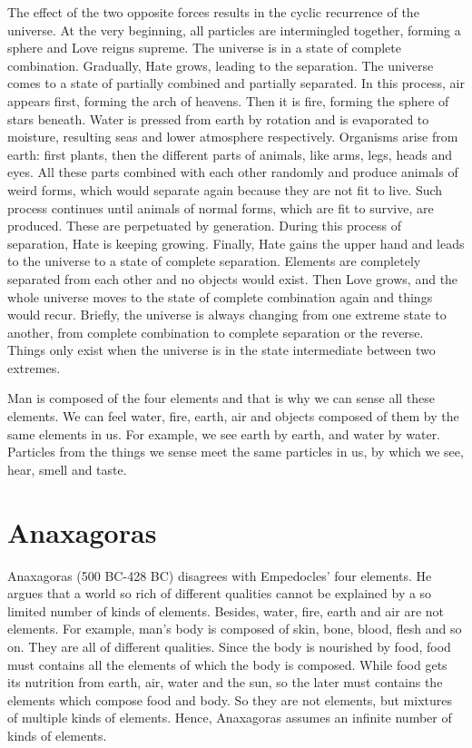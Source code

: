 \documentclass[11pt]{article}
\begin{document}
\begin{sloppypar}
The effect of the two opposite forces results in the cyclic recurrence of the universe. 
At the very beginning, all particles are intermingled together, forming a sphere and Love reigns supreme. 
The universe is in a state of complete combination. 
Gradually, Hate grows, leading to the separation. 
The universe comes to a state of partially combined and partially separated. 
In this process, air appears first, forming the arch of heavens. 
Then it is fire, forming the sphere of stars beneath. 
Water is pressed from earth by rotation and is evaporated to moisture, resulting seas and lower atmosphere respectively. 
Organisms arise from earth: first plants, then the different parts of animals, like arms, legs, heads and eyes. 
All these parts combined with each other randomly and produce animals of weird forms, which would separate again because they are not fit to live. 
Such process continues until animals of normal forms, which are fit to survive, are produced. 
These are perpetuated by generation. 
During this process of separation, Hate is keeping growing. 
Finally, Hate gains the upper hand and leads to the universe to a state of complete separation. 
Elements are completely separated from each other and no objects would exist. 
Then Love grows, and the whole universe moves to the state of complete combination again and things would recur. 
Briefly, the universe is always changing from one extreme state to another, from complete combination to complete separation or the reverse. 
Things only exist when the universe is in the state intermediate between two extremes. 

\par

Man is composed of the four elements and that is why we can sense all these elements. 
We can feel water, fire, earth, air and objects composed of them by the same elements in us. 
For example, we see earth by earth, and water by water. 
Particles from the things we sense meet the same particles in us, by which we see, hear, smell and taste.
  
\section{Anaxagoras}
Anaxagoras (500 BC-428 BC) disagrees with Empedocles’ four elements. 
He argues that a world so rich of different qualities cannot be explained by a so limited number of kinds of elements. 
Besides, water, fire, earth and air are not elements. 
For example, man’s body is composed of skin, bone, blood, flesh and so on. 
They are all of different qualities. 
Since the body is nourished by food, food must contains all the elements of which the body is composed. 
While food gets its nutrition from earth, air, water and the sun, so the later must contains the elements which compose food and body. 
So they are not elements, but mixtures of multiple kinds of elements. 
Hence, Anaxagoras assumes an infinite number of kinds of elements. 


\end{sloppypar}
\end{document}
